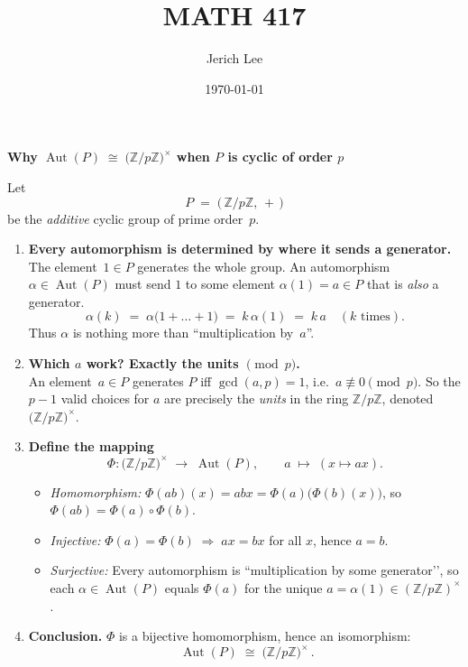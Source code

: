 \documentclass[12pt]{article}
\title{MATH 417}
\author{Jerich Lee}
\date{\today}
\theoremstyle{definition} %
\theoremstyle{plain} %
\begin{document}
\maketitle

\newcommand{\Z}{\mathbb{Z}}
\newcommand{\Aut}{\operatorname{Aut}}

\begin{center}
\textbf{Why $\Aut(P)\;\cong\;\bigl(\Z/p\Z\bigr)^{\times}$ when $P$ is cyclic of order $p$}
\end{center}

\medskip
Let 
\[
   P \;=\; \bigl(\, \Z/p\Z,\,+\,\bigr)
\]
be the \emph{additive} cyclic group of prime order~$p$.

\begin{enumerate}
   \item \textbf{Every automorphism is determined by where it sends a generator.}\\
         The element~$1\in P$ generates the whole group.  
         An automorphism $\alpha\in\Aut(P)$ must send $1$ to some element 
         $\alpha(1)=a\in P$ that is \emph{also} a generator.
         \[
            \alpha(k)\;=\;\alpha\!\bigl(1+\dots+1\bigr)
            \;=\;k\,\alpha(1)
            \;=\;k\,a\quad(\text{$k$ times}).
         \]
         Thus $\alpha$ is nothing more than ``multiplication by~$a$''.

   \item \textbf{Which $a$ work?  Exactly the units $\pmod{p}$.}\\
         An element~$a\in P$ generates $P$ iff $\gcd(a,p)=1$,
         i.e.\ $a\not\equiv 0\pmod{p}$.  
         So the $p-1$ valid choices for $a$ are precisely the
         \emph{units} in the ring $\Z/p\Z$, denoted
         $\bigl(\Z/p\Z\bigr)^{\times}$.

   \item \textbf{Define the mapping}
         \[
            \Phi : \bigl(\Z/p\Z\bigr)^{\times}\;\longrightarrow\;\Aut(P),
            \qquad
            a \;\longmapsto\;(x\mapsto ax).
         \]
         \begin{itemize}
            \item \emph{Homomorphism:}
                  $\Phi(ab)(x)=abx=\Phi(a)\!\bigl(\Phi(b)(x)\bigr)$,  
                  so $\Phi(ab)=\Phi(a)\circ\Phi(b)$.
            \item \emph{Injective:}
                  $\Phi(a)=\Phi(b)\;\Rightarrow\;ax=bx$ for all $x$,
                  hence $a=b$.
            \item \emph{Surjective:}
                  Every automorphism is ``multiplication by some generator’’,
                  so each $\alpha\in\Aut(P)$ equals $\Phi(a)$
                  for the unique $a=\alpha(1)\in(\Z/p\Z)^{\times}$.
         \end{itemize}

   \item \textbf{Conclusion.}\;
         $\Phi$ is a bijective homomorphism, hence an isomorphism:
         \[
            \boxed{\;\Aut(P)\;\cong\;\bigl(\Z/p\Z\bigr)^{\times}\,. }
         \]
\end{enumerate}
\end{document}
